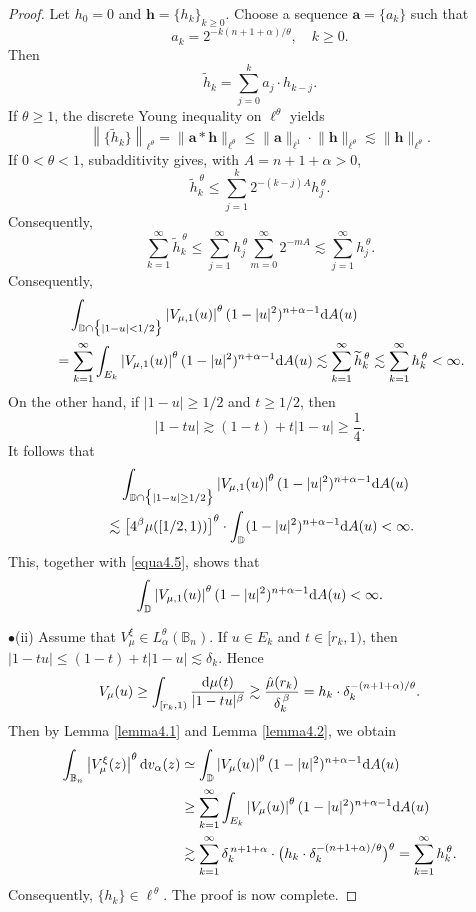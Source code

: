 \documentclass[preprint,12pt,times]{elsarticle}
\theoremstyle{definition}
\theoremstyle{remark}
\numberwithin{equation}{section}
\begin{document}
\begin{proof}
Let $h_0=0$ and $\mathbf{h}=\{h_k\}_{k\geq 0}$. Choose a sequence $\mathbf{a}=\{a_k\}$ such that
\[
     a_k=2^{-k(n+1+\alpha)/\theta},\quad k\geq 0.
\]
Then 
\[
    \widetilde{h}_k=\sum_{j=0}^{k}a_j\cdot h_{k-j}.
\]
  If  $\theta\geq 1$, the discrete Young inequality on $\ell^{\theta}$ yields
\[
    \left\|\{\widetilde{h}_k\}\right\|_{\ell^{\theta}}=\big\|\mathbf{a}*\mathbf{h}\big\|_{\ell^{\theta}}\leq \big\|\mathbf{a}\big\|_{\ell^1}\cdot \big\|\mathbf{h}\big\|_{\ell^{\theta}}\lesssim \big\|\mathbf{h}\big\|_{\ell^{\theta}}.
\]
 If $0<\theta<1$, subadditivity gives, with $A=n+1+\alpha>0$,
\[
    \widetilde h_k^{\,\theta}
    \leq \sum_{j=1}^{k}2^{-(k-j)A}h_j^{\,\theta}.
\]
Consequently,
\[
    \sum_{k=1}^{\infty}\widetilde h_k^{\,\theta}
    \leq \sum_{j=1}^{\infty}h_j^{\,\theta}
          \sum_{m=0}^{\infty}2^{-mA}
    \lesssim \sum_{j=1}^{\infty}h_j^{\,\theta}.
\]
 Consequently, 
\begin{equation}\label{equa4.5}
\begin{split}
&\quad \int_{\mathbb{D}\cap \big\{|1-u|<1/2\big\}}\left|V_{\mu,1}(u)\right|^{\theta}(1-|u|^2)^{n+\alpha-1}{\rm d}A(u)\\
&=\sum_{k=1}^{\infty}\int_{E_k}\left|V_{\mu,1}(u)\right|^{\theta}(1-|u|^2)^{n+\alpha-1}{\rm d}A(u)\lesssim \sum_{k=1}^{\infty}\widetilde{h}_k^{\,\theta}\lesssim \sum_{k=1}^{\infty}h_k^{\,\theta}<\infty.
\end{split}
\end{equation}
On the other hand, if $|1-u|\geq 1/2$ and $t\geq 1/2$, then
\[
    |1-tu|\gtrsim (1-t)+t|1-u|\geq \frac{1}{4}.
\]
It follows that 
\begin{align*}
&\quad\int_{\mathbb{D}\cap\big\{|1-u|\geq 1/2\big\}}\left|V_{\mu,1}(u)\right|^{\theta}(1-|u|^2)^{n+\alpha-1}{\rm d}A(u)\\
&\lesssim \left[4^{\beta}\mu([1/2,1))\right]^{\theta}\cdot\int_{\mathbb{D}}(1-|u|^2)^{n+\alpha-1}{\rm d}A(u)<\infty.
\end{align*}
This, together with \eqref{equa4.5}, shows that
\[
    \int_{\mathbb{D}}\left|V_{\mu,1}(u)\right|^{\theta}(1-|u|^2)^{n+\alpha-1}{\rm d}A(u)<\infty.
\]

$\bullet$(ii) Assume that $V_{\mu}^{\xi}\in L_{\alpha}^{\theta}(\mathbb{B}_n)$. If $u\in E_k$ and $t\in [r_k,1)$, then $|1-tu|\leq (1-t)+t|1-u|\lesssim \delta_k$. Hence
\[
    V_{\mu}(u)\geq \int_{[r_k,1)}\frac{{\rm d}\mu(t)}{|1-tu|^{\beta}}\gtrsim \frac{\hat{\mu}(r_k)}{\delta_k^{\,\beta}}=h_k\cdot \delta_k^{-(n+1+\alpha)/\theta}.
\]
Then by Lemma \ref{lemma4.1} and Lemma \ref{lemma4.2}, we obtain
\begin{align*}
\int_{\mathbb B_n}\left|V_{\mu}^{\xi}(z)\right|^{\theta}{\rm d}v_{\alpha}(z)&\simeq\int_{\mathbb{D}}\left|V_{\mu}(u)\right|^{\theta}(1-|u|^2)^{n+\alpha-1}{\rm d}A(u)\\
&\geq \sum_{k=1}^{\infty}\int_{E_k}\left|V_{\mu}(u)\right|^{\theta}(1-|u|^2)^{n+\alpha-1}{\rm d}A(u)\\
&\gtrsim \sum_{k=1}^{\infty}\delta_k^{\,n+1+\alpha}\cdot \big(h_k\cdot \delta_k^{-(n+1+\alpha)/\theta}\big)^{\theta}=\sum_{k=1}^{\infty}h_k^{\,\theta}.
\end{align*}
Consequently, $\{h_k\}\in \ell^{\,\theta}$. The proof is now complete.
\end{proof}
\end{document}
